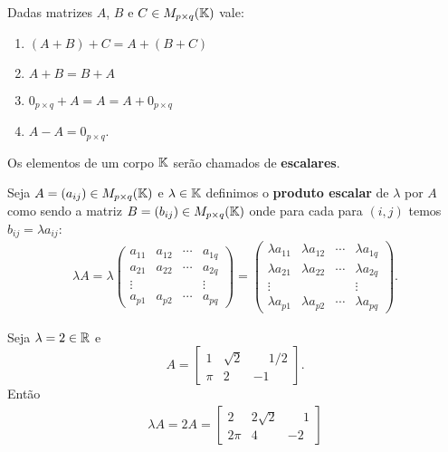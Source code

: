 \begin{proposicao}
	Dadas matrizes $A$, $B$ e $C \in M_{p\times q}(\mathbb{K})$ vale:
	\begin{enumerate}[label={\roman*})]
		\item $(A + B) + C = A + (B + C)$
		\item $A + B = B + A$
        \item $0_{p\times q} + A = A = A + 0_{p\times q}$
        \item $A - A = 0_{p\times q}$.
	\end{enumerate}
\end{proposicao}

\begin{observacao}
    Os elementos de um corpo $\mathbb{K}$ serão chamados de \textbf{escalares}.
\end{observacao}

\begin{definicao}
    Seja $A = (a_{ij}) \in M_{p\times q}(\mathbb{K})$ e $\lambda \in \mathbb{K}$ definimos o \textbf{produto escalar} de $\lambda$ por $A$ como sendo a matriz $B = (b_{ij}) \in M_{p\times q}(\mathbb{K})$ onde para cada para $(i,j)$ temos $b_{ij} = \lambda a_{ij}$:
	\begin{align*}
		\lambda A = \lambda \begin{pmatrix}
		a_{11} & a_{12} & \cdots & a_{1q}\\
		a_{21} & a_{22} & \cdots & a_{2q}\\
		\vdots & & & \vdots\\
		a_{p1} & a_{p2} & \cdots & a_{pq}
	\end{pmatrix} = \begin{pmatrix}
		\lambda a_{11} & \lambda a_{12} & \cdots & \lambda a_{1q}\\
		\lambda a_{21} & \lambda a_{22} & \cdots & \lambda a_{2q}\\
		\vdots & & & \vdots\\
		\lambda a_{p1} & \lambda a_{p2} & \cdots & \lambda a_{pq}
	\end{pmatrix}.
	\end{align*}
\end{definicao}
\begin{exemplo}
    Seja $\lambda = 2 \in \mathbb{R}$ e
    \[
        A = \begin{bmatrix}
            1 & \sqrt{2} & \phantom{-}1/2\\
            \pi & 2 & -1
        \end{bmatrix}.
    \]
    Então
    \begin{align*}
        \lambda A = 2A = \begin{bmatrix}
            2 & 2\sqrt{2} & \phantom{-}1\\
            2\pi & 4 & -2
        \end{bmatrix}
    \end{align*}
\end{exemplo}

